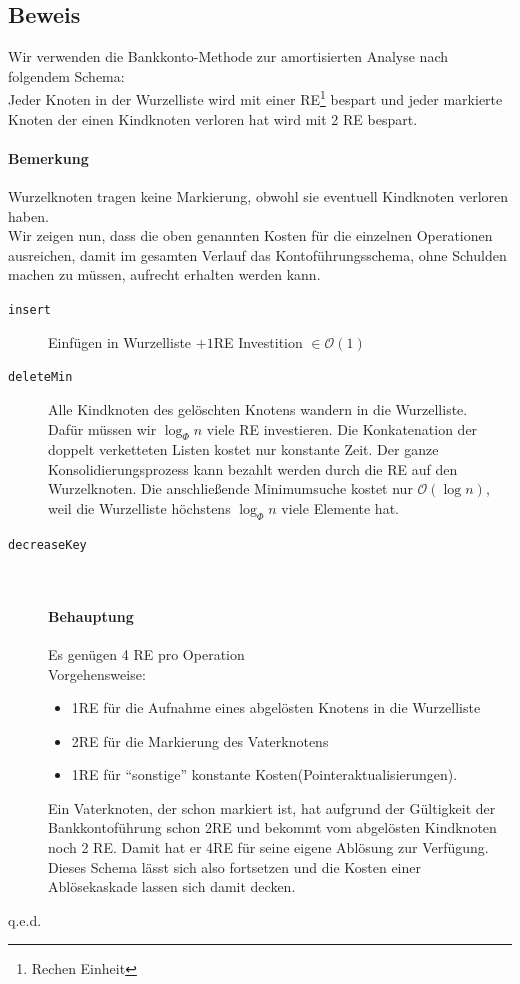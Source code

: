 \subsection{Beweis}
Wir verwenden die Bankkonto-Methode zur amortisierten Analyse nach folgendem Schema:\\
Jeder Knoten in der Wurzelliste wird mit einer RE\footnote{Rechen Einheit} bespart und jeder markierte Knoten der einen Kindknoten verloren hat wird mit 2 RE bespart.
\paragraph{Bemerkung}
Wurzelknoten tragen keine Markierung, obwohl sie eventuell Kindknoten verloren haben.\\

Wir zeigen nun, dass die oben genannten Kosten für die einzelnen Operationen ausreichen, damit im gesamten Verlauf das Kontoführungsschema, ohne Schulden machen zu müssen, aufrecht erhalten werden kann.\\
\begin{description}
	\item[\texttt{insert}] Einfügen in Wurzelliste $+1$RE Investition $\in\mathcal{O}(1)$\\
	\item[\texttt{deleteMin}] Alle Kindknoten des gelöschten Knotens wandern in die Wurzelliste.\\ Dafür müssen wir $\log_\Phi n$ viele RE investieren. Die Konkatenation der doppelt verketteten Listen kostet nur konstante Zeit. Der ganze Konsolidierungsprozess kann bezahlt werden durch die RE auf den Wurzelknoten. Die anschließende Minimumsuche kostet nur $\mathcal{O}(\log n)$, weil die Wurzelliste höchstens $\log_\Phi n$ viele Elemente hat.
	\item[\texttt{decreaseKey}] $ $
	\paragraph{Behauptung} Es genügen 4 RE pro Operation\\
	Vorgehensweise:
	\begin{itemize}
		\item 1RE für die Aufnahme eines abgelösten Knotens in die Wurzelliste
		\item 2RE für die Markierung des Vaterknotens
		\item 1RE für "`sonstige"' konstante Kosten(Pointeraktualisierungen).
	\end{itemize}
	Ein Vaterknoten, der schon markiert ist, hat aufgrund der Gültigkeit der Bankkontoführung schon 2RE und bekommt vom abgelösten Kindknoten noch 2 RE. Damit hat er 4RE für seine eigene Ablösung zur Verfügung. Dieses Schema lässt sich also fortsetzen und die Kosten einer Ablösekaskade lassen sich damit decken. %
\end{description}
\begin{flushright}
	q.e.d.
\end{flushright}